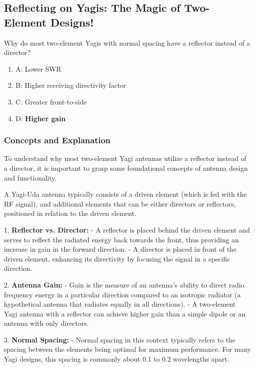 \subsection{Reflecting on Yagis: The Magic of Two-Element Designs!}

\begin{tcolorbox}[colback=gray!10, colframe=black, title=E9D11]
Why do most two-element Yagis with normal spacing have a reflector instead of a director? 

\begin{enumerate}
    \item A: Lower SWR
    \item B: Higher receiving directivity factor
    \item C: Greater front-to-side
    \item D: \textbf{Higher gain}
\end{enumerate} \end{tcolorbox}

\subsubsection{Concepts and Explanation}

To understand why most two-element Yagi antennas utilize a reflector instead of a director, it is important to grasp some foundational concepts of antenna design and functionality. 

A Yagi-Uda antenna typically consists of a driven element (which is fed with the RF signal), and additional elements that can be either directors or reflectors, positioned in relation to the driven element. 

1. \textbf{Reflector vs. Director:} 
   - A reflector is placed behind the driven element and serves to reflect the radiated energy back towards the front, thus providing an increase in gain in the forward direction. 
   - A director is placed in front of the driven element, enhancing its directivity by focusing the signal in a specific direction. 

2. \textbf{Antenna Gain:} 
   - Gain is the measure of an antenna's ability to direct radio frequency energy in a particular direction compared to an isotropic radiator (a hypothetical antenna that radiates equally in all directions).
   - A two-element Yagi antenna with a reflector can achieve higher gain than a simple dipole or an antenna with only directors.

3. \textbf{Normal Spacing:} 
   - Normal spacing in this context typically refers to the spacing between the elements being optimal for maximum performance. For many Yagi designs, this spacing is commonly about 0.1 to 0.2 wavelengths apart.


